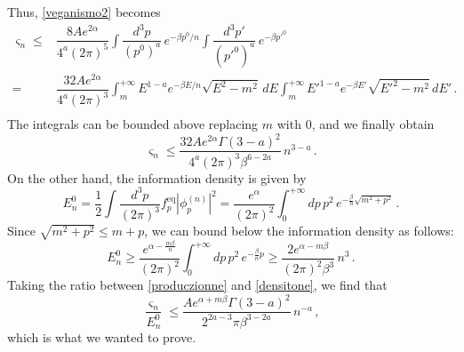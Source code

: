 \documentclass[a4paper, amsfonts, amssymb, amsmath, reprint, showkeys, nofootinbib, twoside, onecolumn,notitlepage,,longbibliography]{revtex4-2}
\theoremstyle{definition}
\theoremstyle{theorem}
\theoremstyle{corollary}
\begin{document}
Thus, \eqref{veganismo2} becomes
\begin{equation}\label{produczionne}
\begin{split}
 \varsigma_n \leq {}&  \dfrac{8 Ae^{2\alpha}}{4^a(2\pi)^{5}} 
\int \dfrac{d^3p}{ (p^0)^a}   \, e^{-\beta p^0/n} \int \dfrac{d^3p'}{ (p'^0)^a}   \, e^{-\beta p'^0} \\ ={}& \dfrac{32 Ae^{2\alpha}}{4^a(2\pi)^3} 
 \int_m^{+\infty}  E^{1-a} e^{-\beta E/n} \sqrt{E^2{-}m^2} \, dE   \int_m^{+\infty}  E'^{1-a} e^{-\beta E'} \sqrt{E'^2{-}m^2} \, dE'   \, .\\
\end{split}
\end{equation}
The integrals can be bounded above replacing $m$ with $0$, and we finally obtain
\begin{equation}
 \varsigma_n \leq  \dfrac{32 Ae^{2\alpha} \Gamma(3{-}a)^2}{4^a(2\pi)^{3}\beta^{6-2a}} \,  n^{3-a} \, .
\end{equation}
On the other hand, the information density is given by
\begin{equation}
    E^0_n = \dfrac{1}{2} \int \dfrac{d^3 p}{(2\pi)^3} f^{\text{eq}}_p |\phi_p^{(n)}|^2 = \dfrac{e^\alpha}{(2\pi)^2} \int_0^{+\infty} dp \, p^2 \, e^{-\frac{\beta}{n} \sqrt{m^2+p^2}} \, .
\end{equation}
Since $\sqrt{m^2+p^2} \leq m+p$, we can bound below the information density as follows:
\begin{equation}\label{densitone}
  E^0_n \geq \dfrac{e^{\alpha - \frac{m\beta}{n}}}{(2\pi)^2} \int_0^{+\infty} dp \, p^2 \, e^{-\frac{\beta}{n} p} \geq \dfrac{2e^{\alpha - m\beta}}{(2\pi)^2 \beta^3} \, n^3 \, .   
\end{equation}
Taking the ratio between \eqref{produczionne} and \eqref{densitone}, we find that
\begin{equation}
    \dfrac{ \varsigma_n}{E_n^0} \leq \dfrac{Ae^{\alpha+m\beta} \Gamma(3{-}a)^2}{2^{2a-3} \pi\beta^{3-2a}} \,  n^{-a} \, ,
\end{equation}
which is what we wanted to prove.\\
\end{document}

